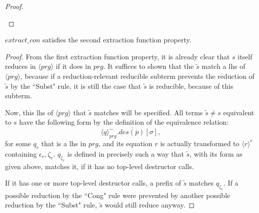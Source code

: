 \begin{lemma}
\begin{proof}
\begin{enumerate}
\end{enumerate}

\end{proof}

\end{lemma}

\begin{lemma}

$extract\_con$ satisfies the second extraction function property.

\begin{proof}

From the first extraction function property, it is already clear that $s$ itself reduces in $\langle prg \rangle$ if it does in $prg$. It suffices to shown that the $\widetilde{s}$ match a lhs of $\langle prg \rangle$, because if a reduction-relevant reducible subterm prevents the reduction of $\widetilde{s}$ by the ``Subst" rule, it is still the case that $\widetilde{s}$ is reducible, because of this subterm.

Now, this lhs of $\langle prg \rangle$ that $\widetilde{s}$ matches will be specified. All terms $\widetilde{s} \neq s$ equivalent to $s$ have the following form by the definition of the equivalence relation:
\begin{equation*}
\langle q \rangle^{\sim}_{prg}.\overline{des(\overline{p})}[\sigma],
\end{equation*}
for some $q_r$ that is a lhs in $prg$, and its equation $r$ is actually transformed to $\langle r \rangle^e$ containing $\epsilon_r, \zeta_r$. $q_{\zeta_r}$ is defined in precisely such a way that $\widetilde{s}$, with its form as given above, matches it, if it has no top-level destructor calls.

If it has one or more top-level destructor calls, a prefix of $\widetilde{s}$ matches $q_{\zeta_r}$. If a possible reduction by the ``Cong" rule were prevented by another possible reduction by the ``Subst" rule, $\widetilde{s}$ would still reduce anyway.

\end{proof}

\end{lemma}

